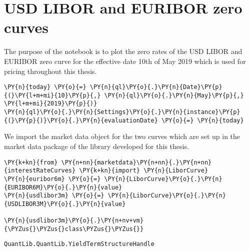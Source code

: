     

    
    \hypertarget{usd-libor-and-euribor-zero-curves}{%
\section{USD LIBOR and EURIBOR zero
curves}\label{usd-libor-and-euribor-zero-curves}}

The purpose of the notebook is to plot the zero rates of the USD LIBOR
and EURIBOR zero curve for the effective date 10th of May 2019 which is
used for pricing throughout this thesis.

    \begin{tcolorbox}[breakable, size=fbox, boxrule=1pt, pad at break*=1mm,colback=cellbackground, colframe=cellborder]
\begin{Verbatim}[commandchars=\\\{\}]
\PY{n}{today} \PY{o}{=} \PY{n}{ql}\PY{o}{.}\PY{n}{Date}\PY{p}{(}\PY{l+m+mi}{10}\PY{p}{,} \PY{n}{ql}\PY{o}{.}\PY{n}{May}\PY{p}{,} \PY{l+m+mi}{2019}\PY{p}{)}
\PY{n}{ql}\PY{o}{.}\PY{n}{Settings}\PY{o}{.}\PY{n}{instance}\PY{p}{(}\PY{p}{)}\PY{o}{.}\PY{n}{evaluationDate} \PY{o}{=} \PY{n}{today}
\end{Verbatim}
\end{tcolorbox}

    We import the market data object for the two curves which are set up in
the market data package of the library developed for this thesis.

    \begin{tcolorbox}[breakable, size=fbox, boxrule=1pt, pad at break*=1mm,colback=cellbackground, colframe=cellborder]
\begin{Verbatim}[commandchars=\\\{\}]
\PY{k+kn}{from} \PY{n+nn}{marketdata}\PY{n+nn}{.}\PY{n+nn}{interestRateCurves} \PY{k+kn}{import} \PY{n}{LiborCurve}
\PY{n}{euribor6m} \PY{o}{=} \PY{n}{LiborCurve}\PY{o}{.}\PY{n}{EURIBOR6M}\PY{o}{.}\PY{n}{value}
\PY{n}{usdlibor3m} \PY{o}{=} \PY{n}{LiborCurve}\PY{o}{.}\PY{n}{USDLIBOR3M}\PY{o}{.}\PY{n}{value}

\PY{n}{usdlibor3m}\PY{o}{.}\PY{n+nv+vm}{\PYZus{}\PYZus{}class\PYZus{}\PYZus{}}
\end{Verbatim}
\end{tcolorbox}

            \begin{tcolorbox}[breakable, size=fbox, boxrule=.5pt, pad at break*=1mm, opacityfill=0]
\begin{Verbatim}[commandchars=\\\{\}]
QuantLib.QuantLib.YieldTermStructureHandle
\end{Verbatim}
\end{tcolorbox}
        
